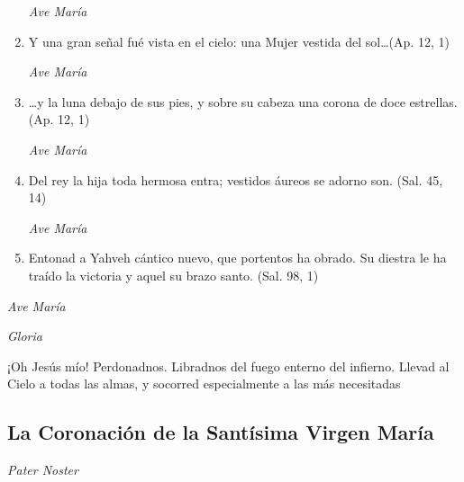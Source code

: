 \documentclass[a4paper,11pt, oneside]{report}
\begin{document}
\begin{enumerate}
          \textit{Ave María}

          \item Y una gran señal fué vista en el cielo: una Mujer vestida del sol\ldots (Ap. 12, 1)

          \textit{Ave María}

          \item {\ldots}y la luna debajo de sus pies, y sobre su cabeza una corona de doce estrellas. (Ap. 12, 1)

          \textit{Ave María}

          \item Del rey la hija toda hermosa entra; vestidos áureos se adorno son. (Sal. 45, 14)

          \textit{Ave María}

          \item Entonad a Yahveh cántico nuevo, que portentos ha obrado. Su diestra le ha traído la victoria y aquel su brazo santo. (Sal. 98, 1)

        \end{enumerate}

        \textit{Ave María} \par
        \indent\textit{Gloria} \par
        \indent¡Oh Jesús mío! Perdonadnos. Libradnos del fuego enterno del infierno. Llevad al Cielo a todas las almas, y socorred especialmente a las más 
        necesitadas

      \subsection*{La Coronación de la Santísima Virgen María}

        \textit{Pater Noster}
\end{document}
